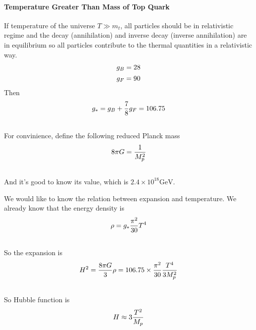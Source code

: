\documentclass[letterpaper,10pt,english]{sphinxmanual}
\begin{document}
\paragraph{Temperature Greater Than Mass of Top Quark}
\label{Cosmology/cosmoIndex:temperature-greater-than-mass-of-top-quark}
If temperature of the universe $T \gg m_t$, all particles should be in relativistic regime and the decay (annihilation) and inverse decay (inverse annihilation) are in equilibrium so all particles contribute to the thermal quantities in a relativistic way.
\begin{gather}
\begin{split}g_B = 28\end{split}\notag\\\begin{split}g_F = 90\end{split}\notag
\end{gather}
Then
\begin{gather}
\begin{split}g _ * = g_B + \frac{7}{8} g _ F = 106.75\end{split}\notag\\\begin{split}\end{split}\notag
\end{gather}
For convinience, define the following reduced Planck mass
\begin{gather}
\begin{split}8\pi G = \frac{1}{M _ p ^2}\end{split}\notag\\\begin{split}\end{split}\notag
\end{gather}
And it's good to know its value, which is $2.4\times 10^{18} \mathrm{GeV}$.

We would like to know the relation between expansion and temperature. We already know that the energy density is
\begin{gather}
\begin{split}\rho = g _ * \frac{\pi^2}{30} T^4\end{split}\notag\\\begin{split}\end{split}\notag
\end{gather}
So the expansion is
\begin{gather}
\begin{split}H^2 = \frac{8\pi G}{3}\rho = 106.75 \times \frac{\pi^2}{30} \frac{T^4}{3 M_p^2}\end{split}\notag\\\begin{split}\end{split}\notag
\end{gather}
So Hubble function is
\begin{gather}
\begin{split}H \approx 3 \frac{T^2}{M_p}\end{split}\notag\\\begin{split}\end{split}\notag
\end{gather}
\end{document}

